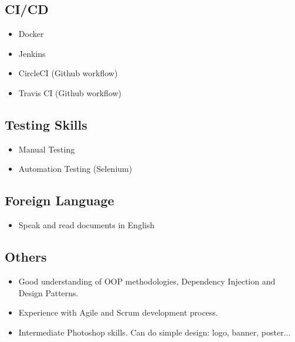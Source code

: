 \begin{cventries}
\begin{row}[cellsep=0.75cm]{3}{3}
\begin{cell}{1}
	\section*{CI/CD}
	\vspace{-1.5ex}
    \begin{itemize}
        \item {Docker}
        \item {Jenkins}
        \item {CircleCI (Github workflow)}
        \item {Travis CI (Github workflow)}
    \end{itemize}
	\end{cell}
\end{row}

\begin{row}[cellsep=0.75cm]{3}{3}
    \begin{cell}{1}
	\section*{Testing Skills}
	\vspace{-1.5ex}
    \begin{itemize}
        \item {Manual Testing}
        \item {Automation Testing (Selenium)}
    \end{itemize}
	\end{cell}
    \begin{cell}{1}
	\section*{Foreign Language}
	\vspace{-1.5ex}
    \begin{itemize}
        \item {Speak and read documents in English}
    \end{itemize}
	\end{cell}
	\begin{cell}{1}
	\section*{Others}
	\vspace{-1.5ex}
    \begin{itemize}
        \item {Good understanding of OOP methodologies, Dependency Injection and Design Patterns.}
        \item {Experience with Agile and Scrum development process.}
        \item {Intermediate Photoshop skills. Can do simple design: logo, banner, poster...}
    \end{itemize}
	\end{cell}
\end{row}

\end{cventries}
